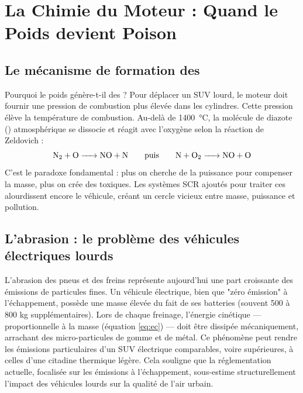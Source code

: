\documentclass[12pt, a4paper]{article}
\begin{document}
\section{La Chimie du Moteur : Quand le Poids devient Poison}

\subsection{Le mécanisme de formation des \texorpdfstring{}{NOx}}

Pourquoi le poids génère-t-il des  ? Pour déplacer un SUV lourd, le moteur doit fournir une pression de combustion plus élevée dans les cylindres. Cette pression élève la température de combustion. Au-delà de \SI{1400}{\celsius}, la molécule de diazote () atmosphérique se dissocie et réagit avec l'oxygène selon la réaction de Zeldovich :
\begin{equation}
    \ce{N2 + O -> NO + N} \qquad \text{puis} \qquad \ce{N + O2 -> NO + O}
\end{equation}
C'est le paradoxe fondamental : plus on cherche de la puissance pour compenser la masse, plus on crée des  toxiques. Les systèmes SCR ajoutés pour traiter ces  alourdissent encore le véhicule, créant un cercle vicieux entre masse, puissance et pollution.

\subsection{L'abrasion : le problème des véhicules électriques lourds}

L'abrasion des pneus et des freins représente aujourd'hui une part croissante des émissions de particules fines. Un véhicule électrique, bien que "zéro émission" à l'échappement, possède une masse élevée du fait de ses batteries (souvent 500 à 800 kg supplémentaires). Lors de chaque freinage, l'énergie cinétique --- proportionnelle à la masse (équation \ref{eq:ec}) --- doit être dissipée mécaniquement, arrachant des micro-particules de gomme et de métal. Ce phénomène peut rendre les émissions particulaires d'un SUV électrique comparables, voire supérieures, à celles d'une citadine thermique légère. Cela souligne que la réglementation actuelle, focalisée sur les émissions à l'échappement, sous-estime structurellement l'impact des véhicules lourds sur la qualité de l'air urbain.
\end{document}
